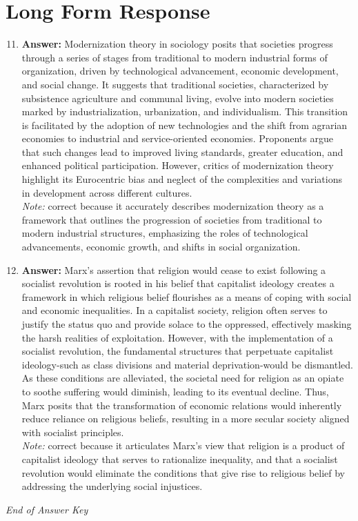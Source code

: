 \documentclass[12pt]{article}
\begin{document}
\section*{Long Form Response}
\begin{enumerate}[label=\arabic*.]
\setcounter{enumi}{10}
\item \textbf{Answer:} Modernization theory in sociology posits that societies progress through a series of stages from traditional to modern industrial forms of organization, driven by technological advancement, economic development, and social change. It suggests that traditional societies, characterized by subsistence agriculture and communal living, evolve into modern societies marked by industrialization, urbanization, and individualism. This transition is facilitated by the adoption of new technologies and the shift from agrarian economies to industrial and service-oriented economies. Proponents argue that such changes lead to improved living standards, greater education, and enhanced political participation. However, critics of modernization theory highlight its Eurocentric bias and neglect of the complexities and variations in development across different cultures.
\\ \textit{Note:} correct because it accurately describes modernization theory as a framework that outlines the progression of societies from traditional to modern industrial structures, emphasizing the roles of technological advancements, economic growth, and shifts in social organization.
\item \textbf{Answer:} Marx's assertion that religion would cease to exist following a socialist revolution is rooted in his belief that capitalist ideology creates a framework in which religious belief flourishes as a means of coping with social and economic inequalities. In a capitalist society, religion often serves to justify the status quo and provide solace to the oppressed, effectively masking the harsh realities of exploitation. However, with the implementation of a socialist revolution, the fundamental structures that perpetuate capitalist ideology-such as class divisions and material deprivation-would be dismantled. As these conditions are alleviated, the societal need for religion as an opiate to soothe suffering would diminish, leading to its eventual decline. Thus, Marx posits that the transformation of economic relations would inherently reduce reliance on religious beliefs, resulting in a more secular society aligned with socialist principles.
\\ \textit{Note:} correct because it articulates Marx's view that religion is a product of capitalist ideology that serves to rationalize inequality, and that a socialist revolution would eliminate the conditions that give rise to religious belief by addressing the underlying social injustices.
\end{enumerate}

\vfill
\noindent\textit{End of Answer Key}
\end{document}
